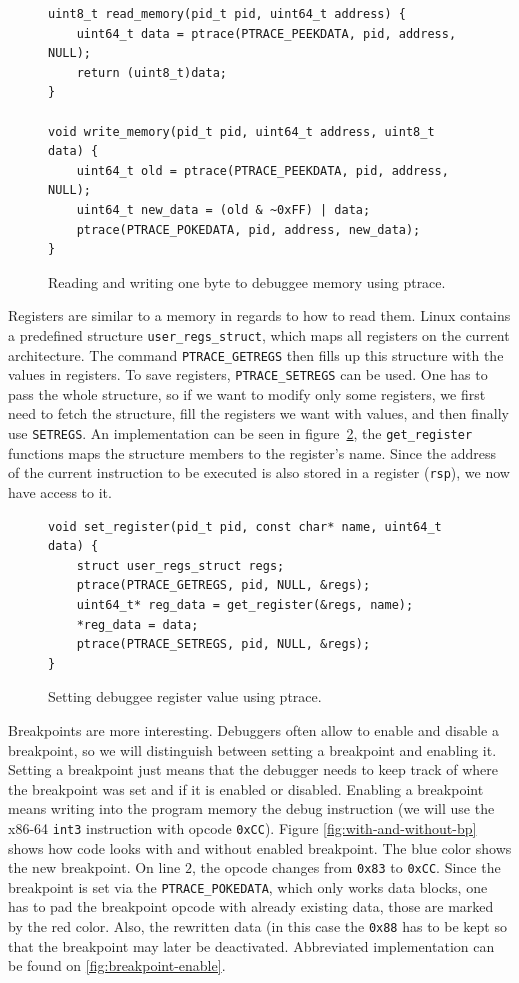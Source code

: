 \begin{figure}
    \begin{verbatim}
uint8_t read_memory(pid_t pid, uint64_t address) {
    uint64_t data = ptrace(PTRACE_PEEKDATA, pid, address, NULL);
    return (uint8_t)data;
}

void write_memory(pid_t pid, uint64_t address, uint8_t data) {
    uint64_t old = ptrace(PTRACE_PEEKDATA, pid, address, NULL);
    uint64_t new_data = (old & ~0xFF) | data;
    ptrace(PTRACE_POKEDATA, pid, address, new_data);
}
    \end{verbatim}
    \caption{Reading and writing one byte to debuggee memory using ptrace.}
    \label{fig:write-read}
\end{figure}

Registers are similar to a memory in regards to how to read them. Linux
contains a predefined structure \texttt{user\_regs\_struct}, which maps all
registers on the current architecture. The command \texttt{PTRACE\_GETREGS}
then fills up this structure with the values in registers. To save registers,
\texttt{PTRACE\_SETREGS} can be used. One has to pass the whole structure, so
if we want to modify only some registers, we first need to fetch the structure,
fill the registers we want with values, and then finally use \texttt{SETREGS}.
An implementation can be seen in figure~\ref{fig:set-register}, the
\texttt{get\_register} functions maps the structure members to the register's
name. Since the address of the current instruction to be executed is also
stored in a register (\texttt{rsp}), we now have access to it.

\begin{figure}
    \begin{verbatim}
void set_register(pid_t pid, const char* name, uint64_t data) {
    struct user_regs_struct regs;
    ptrace(PTRACE_GETREGS, pid, NULL, &regs);
    uint64_t* reg_data = get_register(&regs, name);
    *reg_data = data;
    ptrace(PTRACE_SETREGS, pid, NULL, &regs);
}
    \end{verbatim}
    \caption{Setting debuggee register value using ptrace.}
    \label{fig:set-register}
\end{figure}

Breakpoints are more interesting. Debuggers often allow to enable and disable a
breakpoint, so we will distinguish between setting a breakpoint and enabling
it. Setting a breakpoint just means that the debugger needs to keep track of
where the breakpoint was set and if it is enabled or disabled. Enabling a
breakpoint means writing into the program memory the debug instruction (we will
use the x86-64 \texttt{int3} instruction with opcode \texttt{0xCC}). Figure
\ref{fig:with-and-without-bp} shows how code looks with and without enabled
breakpoint. The blue color shows the new breakpoint. On line $2$, the opcode
changes from \texttt{0x83} to \texttt{0xCC}. Since the breakpoint is set via
the \texttt{PTRACE\_POKEDATA}, which only works data blocks, one has to pad the
breakpoint opcode with already existing data, those are marked by the red
color. Also, the rewritten data (in this case the \texttt{0x88} has to be kept
so that the breakpoint may later be deactivated. Abbreviated implementation can
be found on \ref{fig:breakpoint-enable}.

